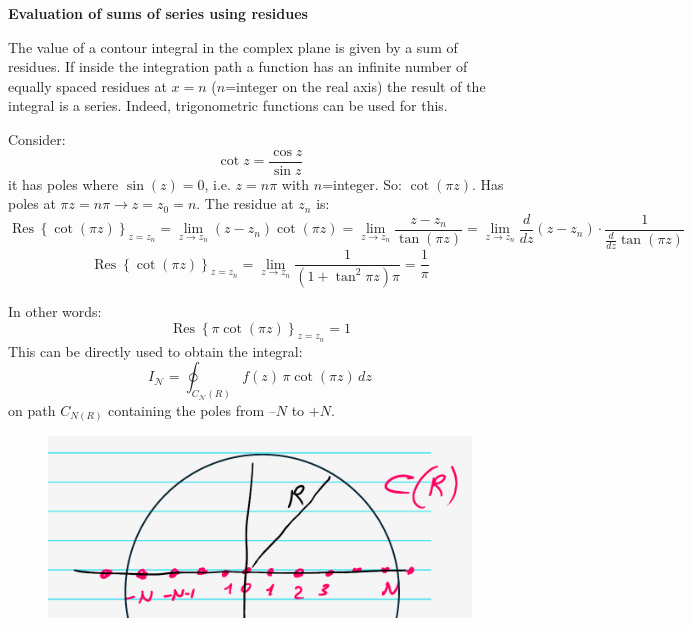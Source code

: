 \documentclass{article}
\begin{document}
\vspace{2mm}\noindent
\textbf{Evaluation of sums of series using residues}

\noindent
The value of a contour integral in the complex plane is given by a sum of residues. If inside the integration path a function has an infinite number of equally spaced residues at $x=n$ ($n$=integer on the real axis) the result of the integral is a series. Indeed, trigonometric functions can be used for this.

\noindent
Consider:
\begin{equation}
    \cot{z} = \frac{\cos z}{\sin z}
\end{equation}
it has poles where $\sin(z)=0$, i.e. $z=n\pi$ with $n$=integer. So: $\cot (\pi z)$. Has poles at $\pi z=n\pi \rightarrow z = z_0 = n$. The residue at $z_n$ is:
\begin{equation}
    \operatorname{Res} \left\{ \cot(\pi z) \right\}_{z = z_n}
= \lim_{z \to z_n} (z - z_n) \cot(\pi z)
= \lim_{z \to z_n} \frac{z - z_n}{\tan(\pi z)}
= \lim_{z \to z_n} \frac{d}{dz}(z - z_n) \cdot \frac{1}{\frac{d}{dz} \tan(\pi z)}
\end{equation}
\begin{equation}
    \operatorname{Res} \left\{ \cot(\pi z) \right\}_{z = z_n} = \lim_{z \to z_n} \frac{1}{(1+\tan^2 \pi z )\pi} = \frac{1}{\pi}
\end{equation}

\newpage

\noindent
In other words:
\begin{equation}
    \operatorname{Res} \left\{\pi  \cot(\pi z) \right\}_{z = z_n} = 1
\end{equation}
This can be directly used to obtain the integral:
\begin{equation}
    I_{\mathcal{N}} = \oint_{C_{\mathcal{N}}(R)} f(z)\, \pi \cot(\pi z)\, dz
\end{equation}
on path $C_{N(R)}$ containing the poles from $–N$ to $+N$.
\begin{figure}[h]
    \centering
    \includegraphics[width=0.5\linewidth]{fig48.png}
\end{figure}
\end{document}
